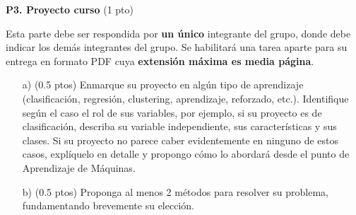 \documentclass[11pt,letterpaper]{article}
\begin{document}
\noindent\textbf{P3. Proyecto curso} (1 pto)
\vspace{5mm}

Esta parte debe ser respondida por \textbf{un único} integrante del grupo, donde debe indicar los demás integrantes del grupo. Se habilitará una tarea aparte para su entrega en formato PDF cuya \textbf{extensión máxima es media página}.
\begin{itemize}
    \item[a)] (0.5 ptos) Enmarque su proyecto en algún tipo de aprendizaje (clasificación, regresión, clustering, aprendizaje, reforzado, etc.). Identifique según el caso el rol de sus variables, por ejemplo, si su proyecto es de clasificación, describa su variable independiente, sus características y sus clases. Si su proyecto no parece caber evidentemente en ninguno de estos casos, explíquelo en detalle y propongo cómo lo abordará desde el punto de Aprendizaje de Máquinas.
    \item[b)] (0.5 ptos) Proponga al menos 2 métodos para resolver su problema, fundamentando brevemente su elección.
\end{itemize}
\end{document}
